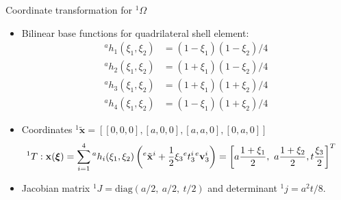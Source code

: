 \documentclass[aspectratio=169]{beamer}
\begin{document}
\begin{frame}{Coordinate transformation for ${}^1\Omega$}
  \begin{itemize}
    \item Bilinear base functions for quadrilateral shell element:
          \begin{align*}
            {}^ah_1(\xi_1,\xi_2) & =(1-\xi_1)(1-\xi_2)/4 \\
            {}^ah_2(\xi_1,\xi_2) & =(1+\xi_1)(1-\xi_2)/4 \\
            {}^ah_3(\xi_1,\xi_2) & =(1+\xi_1)(1+\xi_2)/4 \\
            {}^ah_4(\xi_1,\xi_2) & =(1-\xi_1)(1+\xi_2)/4
          \end{align*}
    \item Coordinates ${}^1\tilde{\mathbf x}=[[0,0,0],[a,0,0], [a,a,0], [0,a,0]]$
          \begin{align*}
            {}^1T: \mathbf x(\boldsymbol\xi) & =\sum_{i=1}^{4}{}^ah_i(\xi_1,\xi_2)\left({}^e\tilde{\mathbf x}^i+\frac{1}{2}\xi_3{}^e t_3^i {}^e\mathbf v_3^i\right)=\left[a\frac{1+\xi_1}{2},\ a\frac{1+\xi_2}{2}, t\frac{\xi_3}{2}\right]^T
          \end{align*}
    \item Jacobian matrix ${}^1J=\text{diag}(a/2,\ a/2,\ t/2)$ and determinant ${}^1j=a^2t/8$.
  \end{itemize}
\end{frame}
\end{document}
